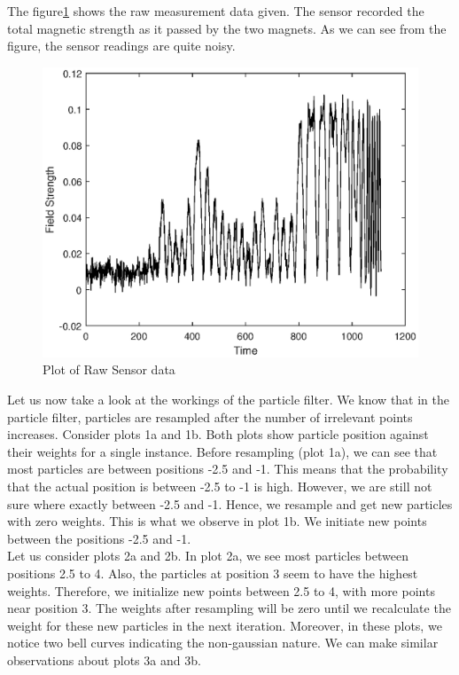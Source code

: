 \documentclass{article}
\begin{document}
The figure\ref{fig:1} shows the raw measurement data given. The sensor recorded the total magnetic strength as it passed by the two magnets. As we can see from the figure, the sensor readings are quite noisy.\\
\begin{figure}[!ht]
\centering
\includegraphics[scale=0.6]{measurement_data.eps}
\caption{Plot of Raw Sensor data}
\label{fig:1}
\end{figure}

Let us now take a look at the workings of the particle filter. We know that in the particle filter, particles are resampled after the number of irrelevant points increases.
Consider plots 1a and 1b. Both plots show particle position against their weights for a single instance. Before resampling (plot 1a), we can see that most particles are between positions -2.5 and -1. This means that the probability that the actual position is between -2.5 to -1 is high. However, we are still not sure where exactly between -2.5 and -1. Hence, we resample and get new particles with zero weights. This is what we observe in plot 1b. We initiate new points between the positions -2.5 and -1.\\

Let us consider plots 2a and 2b. In plot 2a, we see most particles between positions 2.5 to 4. Also, the particles at position 3 seem to have the highest weights. Therefore, we initialize new points between 2.5 to 4, with more points near position 3. The weights after resampling will be zero until we recalculate the weight for these new particles in the next iteration. Moreover, in these plots, we notice two bell curves indicating the non-gaussian nature. We can make similar observations about plots 3a and 3b.\\
\end{document}
